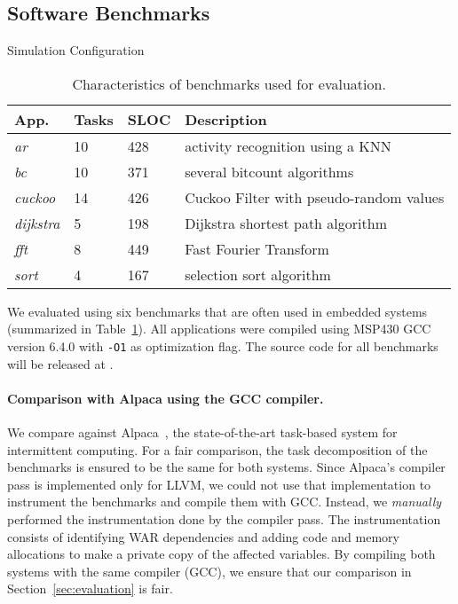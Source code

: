 \subsection{Software Benchmarks}
\label{sec:software_benchmarks}

\begin{table}%
\caption{Simulation Configuration}
\label{tab:one}
\begin{minipage}{\columnwidth}
\begin{center}
\begin{tabular}{llll}
  \toprule
		App.&Tasks&SLOC&Description\\
		\hline
        \emph{ar} &10 &428 & activity recognition using a KNN\\ %
        \emph{bc} &10 &371 & several bitcount algorithms\\
        \emph{cuckoo} &14 &426 & Cuckoo Filter with pseudo-random values\\
        \emph{dijkstra} &5 &198 & Dijkstra shortest path algorithm \\
        \emph{fft} &8 &449 & Fast Fourier Transform\\ %
		\emph{sort} &4 &167 & selection sort algorithm\\
  \bottomrule
\end{tabular}
\end{center}
\end{minipage}
\caption{Characteristics of benchmarks used for evaluation.}
\label{table:benchmark_table}
\end{table}%

We evaluated \sys using six benchmarks that are often used in embedded systems (summarized in Table~\ref{table:benchmark_table}). All applications were compiled using MSP430 GCC~\cite{ti-gcc} version 6.4.0 with \texttt{-O1} as optimization flag. The source code for all benchmarks will be released at \cite{coala_website}.

\paragraph{Comparison with Alpaca using the GCC compiler.}

We compare \sys against Alpaca~\cite{alpaca}, the state-of-the-art task-based system for intermittent computing. For a fair comparison, the task decomposition of the benchmarks is ensured to be the same for both systems.
%
Since Alpaca's compiler pass is implemented only for LLVM, we could not use that implementation to instrument the benchmarks and compile them with GCC. Instead, we \emph{manually} performed the instrumentation done by the compiler pass. The instrumentation consists of identifying WAR dependencies  and adding code and memory allocations to make a private copy of the affected variables.
By compiling both systems with the same compiler (GCC), we ensure that our comparison in Section~\ref{sec:evaluation} is fair.

